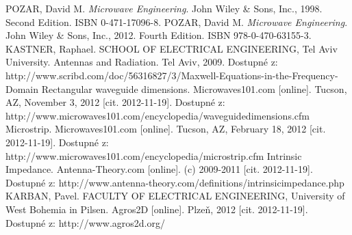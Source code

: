 \documentclass[12pt,a4paper,oneside]{article}
\numberwithin{equation}{section} %
\numberwithin{figure}{section} %
\numberwithin{table}{section} %
\begin{document}
\newpage
{} %
\begin{thebibliography}{10}

 POZAR, David M. \textit{Microwave Engineering}. John Wiley \& Sons, Inc., 1998. Second Edition. ISBN 0-471-17096-8.
 POZAR, David M. \textit{Microwave Engineering}. John Wiley \& Sons, Inc., 2012. Fourth Edition. ISBN 978-0-470-63155-3.
 KASTNER, Raphael. SCHOOL OF ELECTRICAL ENGINEERING, Tel Aviv University. Antennas and Radiation. Tel Aviv, 2009. Dostupné z: http://www.scribd.com/doc/56316827/3/Maxwell-Equations-in-the-Frequency-Domain
 Rectangular waveguide dimensions. Microwaves101.com [online]. Tucson, AZ, November 3, 2012 [cit. 2012-11-19]. Dostupné z: http://www.microwaves101.com/encyclopedia/waveguidedimensions.cfm
 Microstrip. Microwaves101.com [online]. Tucson, AZ, February 18, 2012 [cit. 2012-11-19]. Dostupné z: http://www.microwaves101.com/encyclopedia/microstrip.cfm
 Intrinsic Impedance. Antenna-Theory.com [online]. (c) 2009-2011 [cit. 2012-11-19]. Dostupné z: http://www.antenna-theory.com/definitions/intrinsicimpedance.php
 KARBAN, Pavel. FACULTY OF ELECTRICAL ENGINEERING, University of West Bohemia in Pilsen. Agros2D [online]. Plzeň, 2012 [cit. 2012-11-19]. Dostupné z: http://www.agros2d.org/

\end{thebibliography}

\newpage
{} %
\setlength{\parskip}{0ex}%
\listoffigures

\newpage
{} %
\listoftables

\newpage
\pagestyle{empty} %
\setcounter{page}{1} %
\appendix %
\end{document}
